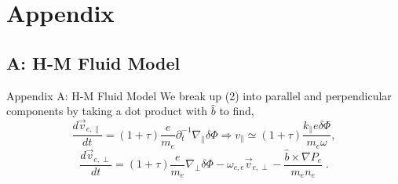 \documentclass[aspectratio=43]{beamer}
\begin{document}

   \section{Appendix}
   \subsection{A: H-M Fluid Model}

   \begin{frame}{Appendix A: H-M Fluid Model}
      \quad We break up (2) into parallel and perpendicular components by taking a dot product with $\hat{b}$ to find,
      \begin{equation}
         \frac{d\vec{v}_{e,\parallel}}{dt} = (1+\tau)\frac{e}{m_e}\partial_t^{-1}\nabla_{\parallel}\delta\Phi \Rightarrow v_{\parallel}
            \simeq (1+\tau)\frac{k_{\parallel}e\delta\Phi}{m_e\omega},
      \end{equation}
      \begin{equation}
         \frac{d\vec{v}_{e,\perp}}{dt} = (1+\tau)\frac{e}{m_e}\nabla_{\perp}\delta\Phi - \omega_{c,e}\vec{v}_{e,\perp}-\frac{\hat{b}\times\nabla P_e}{m_en_e}\;.
      \end{equation}
   \end{frame}
\end{document}
